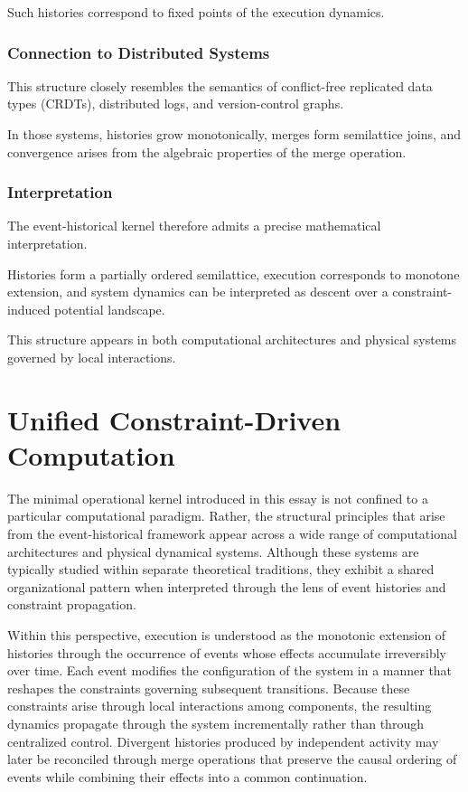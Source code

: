 \documentclass[12pt]{article}
\begin{document}
Such histories correspond to fixed points of the
execution dynamics.

\subsubsection{Connection to Distributed Systems}

This structure closely resembles the semantics of
conflict-free replicated data types (CRDTs),
distributed logs, and version-control graphs.

In those systems, histories grow monotonically,
merges form semilattice joins, and convergence
arises from the algebraic properties of the merge
operation.

\subsubsection{Interpretation}

The event-historical kernel therefore admits a
precise mathematical interpretation.

Histories form a partially ordered semilattice,
execution corresponds to monotone extension,
and system dynamics can be interpreted as descent
over a constraint-induced potential landscape.

This structure appears in both computational
architectures and physical systems governed by
local interactions.


\section{Unified Constraint-Driven Computation}

The minimal operational kernel introduced in this essay
is not confined to a particular computational paradigm.
Rather, the structural principles that arise from the
event-historical framework appear across a wide range of
computational architectures and physical dynamical systems.
Although these systems are typically studied within
separate theoretical traditions, they exhibit a shared
organizational pattern when interpreted through the lens
of event histories and constraint propagation.

Within this perspective, execution is understood as the
monotonic extension of histories through the occurrence
of events whose effects accumulate irreversibly over time.
Each event modifies the configuration of the system in a
manner that reshapes the constraints governing subsequent
transitions. Because these constraints arise through
local interactions among components, the resulting
dynamics propagate through the system incrementally
rather than through centralized control. Divergent
histories produced by independent activity may later be
reconciled through merge operations that preserve the
causal ordering of events while combining their effects
into a common continuation.
\end{document}

